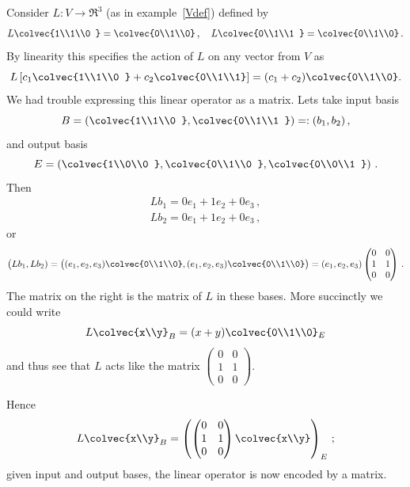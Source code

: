 \begin{example}
Consider 
$L:V\to \Re^3$ (as in example~\ref{Vdef}) defined by 
\[
L\colvec{1\\1\\0 } = \colvec{0\\1\\0}\, ,\quad
L\colvec{0\\1\\1 } = \colvec{0\\1\\0}\, .
\]
By linearity this specifies the action of $L$ on any vector from $V$ as
\[
L\left[ c_1\colvec{1\\1\\0 } + c_2 \colvec{0\\1\\1} \right]= (c_1+c_2)\colvec{0\\1\\0}.
\]
We had trouble expressing this linear operator as a matrix. Lets take input basis
\[
B=\left(\colvec{1\\1\\0 } ,\colvec{0\\1\\1 }\right)=:(b_1,b_2)\, ,
\]
and output basis 
\[
E=\left(\colvec{1\\0\\0 } ,\colvec{0\\1\\0 } ,\colvec{0\\0\\1 }\right)\, .
\]
Then
\begin{gather*}
L b_1 = 0 e_1 + 1e_2+ 0  e_3 \, ,\\
L b_2 = 0 e_1 + 1e_2+ 0  e_3 \, ,
\end{gather*}
or 
\[
\big(Lb_1, L b_2) = \big( (e_1,e_2,e_3)\colvec{0\\1\\0}, (e_1,e_2,e_3)\colvec{0\\1\\0}\big)=(e_1,e_2,e_3)\begin{pmatrix}0&0\\1&1\\0&0
\end{pmatrix}\, .
\]
The matrix on the right is the matrix of $L$ in these bases.
More succinctly we could write
\[
L\colvec{x\\y}_B=(x+y) \colvec{0\\1\\0}_E
\]
and thus see that $L$ acts like the matrix 
$
\begin{pmatrix}
0&0\\
1&1\\
0&0
\end{pmatrix}
$.

Hence
\[L\colvec{x\\y}_B
=\left(  \begin{pmatrix}
0&0\\
1&1\\
0&0
\end{pmatrix}
\colvec{x\\y} \right)_E\, ;
\]
given input and output bases, the linear operator is now encoded by a matrix.
\end{example}
